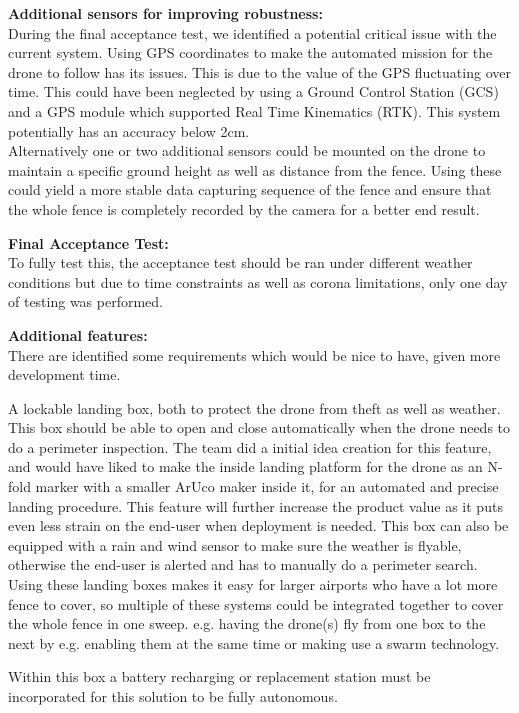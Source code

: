 \documentclass[../Head/Main.tex]{subfiles}
\begin{document}
\textbf{Additional sensors for improving robustness:}\\
During the final acceptance test, we identified a potential critical issue with the current system. Using GPS coordinates to make the automated mission for the drone to follow has its issues. This is due to the value of the GPS fluctuating over time. This could have been neglected by using a Ground Control Station (GCS) and a GPS module which supported Real Time Kinematics (RTK). This system potentially has an accuracy below 2cm. \\
Alternatively one or two additional sensors could be mounted on the drone to maintain a specific ground height as well as distance from the fence. Using these could yield a more stable data capturing sequence of the fence and ensure that the whole fence is completely recorded by the camera for a better end result. 

\textbf{Final Acceptance Test:}\\
To fully test this, the acceptance test should be ran under different weather conditions but due to time constraints as well as corona limitations, only one day of testing was performed. 

\textbf{Additional features:}\\
There are identified some requirements which would be nice to have, given more development time. 

A lockable landing box, both to protect the drone from theft as well as weather. This box should be able to open and close automatically when the drone needs to do a perimeter inspection. The team did a initial idea creation for this feature, and would have liked to make the inside landing platform for the drone as an N-fold marker with a smaller ArUco maker inside it, for an automated and precise landing procedure. This feature will further increase the product value as it puts even less strain on the end-user when deployment is needed. This box can also be equipped with a rain and wind sensor to make sure the weather is flyable, otherwise the end-user is alerted and has to manually do a perimeter search. Using these landing boxes makes it easy for larger airports who have a lot more fence to cover, so multiple of these systems could be integrated together to cover the whole fence in one sweep. e.g. having the drone(s) fly from one box to the next by e.g. enabling them at the same time or making use a swarm technology. 

Within this box a battery recharging or replacement station must be incorporated for this solution to be fully autonomous. 
\end{document}

